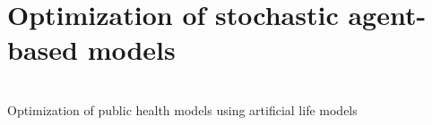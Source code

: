 
\section{Optimization of stochastic agent-based models}
\begin{frame}[c,noframenumbering]
	\centering
	\begin{titleblock}{}
		~\\%
		{\centering\LARGE Optimization of public health models using artificial life models\\}%
		~\\%
	\end{titleblock}
\end{frame}
